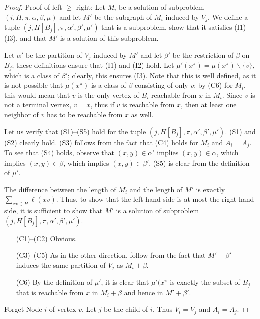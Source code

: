 \begin{proof}
Proof of left \(\geq\) right:
Let \(M_i\) be a solution of subproblem \((i, H, \pi, \alpha, \beta, \mu)\) and let \(M'\) be the subgraph of \(M_i\) induced by \(V_j\). We define a tuple \((j, H[B_j], \pi, \alpha', \beta', \mu')\) that is a subproblem, show that it satisfies (I1)–(I3), and that \(M'\) is a solution of this subproblem.

Let \(\alpha'\) be the partition of \(V_j\) induced by \(M'\) and let \(\beta'\) be the restriction of \(\beta\) on \(B_j\); these definitions ensure that (I1) and (I2) hold. Let \(\mu'(x^\pi ) = \mu(x^\pi ) \backslash \{v\}\), which is a class of \(\beta'\); clearly, this ensures (I3). Note that this is well defined, as it is not possible that \(\mu(x^\pi)\) is a class of \(\beta\) consisting of only \(v\): by (C6) for \(M_i\), this would mean that \(v\) is the only vertex of \(B_i\) reachable from \(x\) in \(M_i\). Since \(v\) is not a terminal vertex, \(v = x\), thus if \(v\) is reachable from \(x\), then at least one neighbor of \(v\) has to be reachable from \(x\) as well.

Let us verify that (S1)–(S5) hold for the tuple \((j, H[B_j], \pi, \alpha', \beta', \mu')\). (S1) and (S2) clearly hold. (S3) follows from the fact that (C4) holds for \(M_i\) and \(A_i = A_j\). To see that (S4) holds, observe that \((x, y) \in \alpha'\) implies \((x, y) \in \alpha\), which implies \((x, y) \in \beta\), which implies \((x, y) \in \beta'\). (S5) is clear from the definition of \(\mu'\).

The difference between the length of \(M_i\) and the length of \(M'\) is exactly \(\sum_{xv \in H} \ell(xv)\). Thus, to show that the left-hand side is at most the right-hand side, it is sufficient to show that \(M'\) is a solution of subproblem \((j, H[B_j], \pi, \alpha', \beta', \mu')\).

\begin{itemize}
    \item[(C1)–(C2)] Obvious.
    \item[(C3)–(C5)] As in the other direction, follow from the fact that \(M' + \beta'\) induces the same partition of \(V_j\) as \(M_i + \beta\).
    \item[(C6)] By the definition of \(\mu'\), it is clear that \(\mu'(x^\pi\) is exactly the subset of \(B_j\) that is reachable from \(x\) in \(M_i + \beta\) and hence in \(M' + \beta'\).
\end{itemize}


Forget Node \(i\) of vertex \(v\). Let \(j\) be the child of \(i\). Thus \(V_i = V_j\) and \(A_i = A_j\).


\end{proof}
